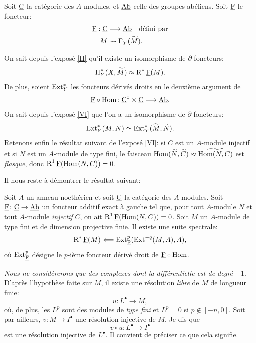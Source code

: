 Soit $\underline{\mathrm{C}}$ la cat\'egorie des $A$-modules, et $\underline{\mathrm{Ab}}$ celle des groupes ab\'eliens. Soit ${\underline{\mathrm{F}}}$ le foncteur:
\begin{align*}
\cF: \ccat&\to \Ab \quad\text{défini par} \\
 M &\rightsquigarrow \Gamma_Y(\widetilde{M}).
\end{align*}

On sait depuis l'expos\'e \ref{II} qu'il existe un isomorphisme de $\partial$-foncteurs:
\[
\operatorname{H}^\ast_Y(X, \widetilde{M})\approx \operatorname{R}^\ast {\underline{\mathrm{F}}}(M).
\]
De plus, soient $\operatorname{Ext}^\ast_Y$ les foncteurs d\'eriv\'es droits en le deuxi\`eme argument de
\[{\cF}\circ \Hom\colon \ccat^\circ \times \ccat \to \Ab.
\]
On sait depuis l'expos\'e \ref{VI} que l'on a un isomorphisme de $\partial$-foncteurs:
\[
\operatorname{Ext}^\ast_Y(M, N)\simeq \operatorname{Ext}^\ast_Y(\widetilde{M}, \widetilde{N}).
\]
Retenons enfin le r\'esultat suivant de l'expos\'e \ref{VI}: si $C$ est un $A$-module injectif et si $N$ est un $A$-module de type fini, le faisceau $\mathop{\underline{\mathrm{Hom}}}\nolimits(\widetilde{N}, \widetilde{C})\approx\widetilde{\operatorname{Hom}(N, C)}$ est \emph{flasque}, donc $\operatorname{R}^1{\underline{\mathrm{F}}}(\operatorname{Hom}(N, C))=0$.

Il nous reste \`a d\'emontrer le r\'esultat suivant:

\begin{lemme} \label{VIII.1.2} Soit $A$ un anneau noeth\'erien et soit $\underline{\mathrm{C}}$ la cat\'egorie des $A$-modules. Soit ${\cF}\colon \ccat\to\Ab$ un foncteur additif exact \`a gauche tel que, pour tout $A$-module $N$ \ignorespaces et tout $A$-module \emph{injectif} $C$, on ait $\operatorname{R}^1{\underline{\mathrm{F}}}(\operatorname{Hom}(N, C))=0$. Soit $M$ un $A$-module de type fini et de dimension projective finie. Il existe une suite spectrale:
\[
\operatorname{R}^\ast {\underline{\mathrm{F}}}(M)\Longleftarrow \operatorname{Ext}^p_{{\underline{\mathrm{F}}}}(\operatorname{Ext}^{-q}(M, A), A), \]
o\`u $\operatorname{Ext}^p_{{\underline{\mathrm{F}}}}$ d\'esigne le $p$-i\`eme foncteur d\'eriv\'e droit de ${\underline{\mathrm{F}}}\circ \operatorname{Hom}$.
\end{lemme}

\emph{Nous ne considérerons que des complexes dont la différentielle est de degré $+1$}. D'apr\`es l'hypoth\`ese faite sur $M$, il existe une r\'esolution \emph{libre} de $M$ de longueur finie:
\[u\colon L^\bullet \to M, \]
o\`u, de plus, les $L^p$ sont des modules de \emph{type fini} et $L^p=0$ si $p\not\in[-n, 0]$. Soit par ailleurs, $v\colon M\to I^\bullet$ une r\'esolution injective de $M$. Je dis que
\begin{equation} \label{eq:VIII.1.1} v\circ u\colon L^\bullet\to I^\bullet
\end{equation}
est une r\'esolution injective de $L^\bullet$. Il convient de pr\'eciser ce que cela signifie.

